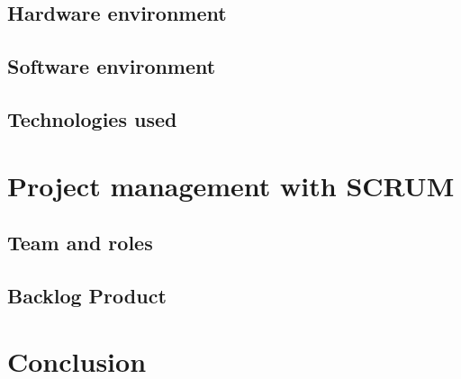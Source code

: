 \documentclass{report}
\begin{document}
\subsection{Hardware environment}
\subsection{Software  environment }
\subsection{Technologies used}
\vspace{1em}
\section{Project management with SCRUM }
\subsection{Team and roles}
\subsection{Backlog Product}
\vspace{1em}
\section*{Conclusion}
\end{document}
